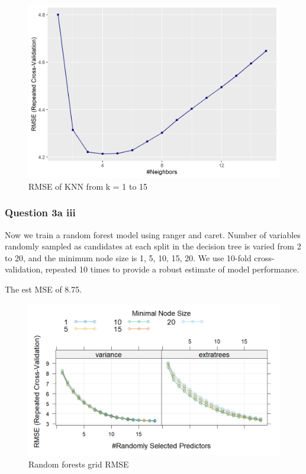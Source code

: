 \documentclass[
]{article}
\begin{document}
\begin{figure}
\centering
\includegraphics[width=4.875in,height=\textheight]{rmse_knn.png}
\caption{RMSE of KNN from k = 1 to 15}
\end{figure}

\hypertarget{question-3a-iii}{%
\subsubsection{Question 3a iii}\label{question-3a-iii}}

Now we train a random forest model using ranger and caret. Number of
variables randomly sampled as candidates at each split in the decision
tree is varied from 2 to 20, and the minimum node size is 1, 5, 10, 15,
20. We use 10-fold cross-validation, repeated 10 times to provide a
robust estimate of model performance.

The est MSE of 8.75.

\begin{figure}
\centering
\includegraphics[width=6.22917in,height=\textheight]{rmse_random_forest.png}
\caption{Random forests grid RMSE}
\end{figure}
\end{document}

